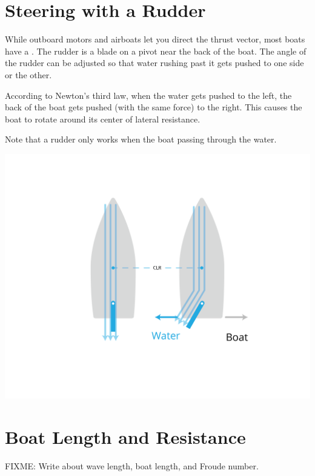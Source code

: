 \section{Steering with a Rudder}
 
While outboard motors and airboats let you direct the thrust vector,  most boats have a .  The rudder is a blade on a pivot near the back of 
the boat.   The angle of the rudder can be adjusted so that water rushing past it gets pushed to one side or the other.

According to Newton's third law,  when the water gets pushed to the left,  the back of the boat gets pushed (with the same force) to the right.  This causes the boat to rotate around its center of lateral resistance.

Note that a rudder only works when the boat passing through the water. 

\includegraphics[width=.75\textwidth]{rudder.png}


\section{Boat Length and Resistance}

FIXME: Write about wave length,  boat length, and Froude number.






